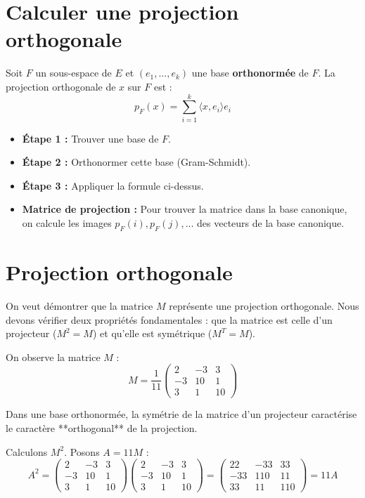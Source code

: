 \documentclass[french]{yLectureNote}
\begin{document}
\section{Calculer une projection orthogonale}
Soit $F$ un sous-espace de $E$ et $(e_1, \dots, e_k)$ une base \textbf{orthonormée} de $F$. La projection orthogonale de $x$ sur $F$ est :
\[ p_F(x) = \sum_{i=1}^k \langle x, e_i \rangle e_i \]
\begin{itemize}
    \item \textbf{Étape 1 :} Trouver une base de $F$.
    \item \textbf{Étape 2 :} Orthonormer cette base (Gram-Schmidt).
    \item \textbf{Étape 3 :} Appliquer la formule ci-dessus.
    \item \textbf{Matrice de projection :} Pour trouver la matrice dans la base canonique, on calcule les images $p_F(i), p_F(j), \dots$ des vecteurs de la base canonique.
\end{itemize}
\section{Projection orthogonale}

On veut démontrer que la matrice $M$ représente une projection orthogonale. Nous devons vérifier deux propriétés fondamentales : que la matrice est celle d'un projecteur ($M^2 = M$) et qu'elle est symétrique ($M^T = M$).

On observe la matrice $M$ :
$$M = \frac{1}{11} \begin{pmatrix} 2 & -3 & 3 \\ -3 & 10 & 1 \\ 3 & 1 & 10 \end{pmatrix}$$

Dans une base orthonormée, la symétrie de la matrice d'un projecteur caractérise le caractère **orthogonal** de la projection.

Calculons $M^2$. Posons $A = 11M$ :
$$A^2 = \begin{pmatrix} 2 & -3 & 3 \\ -3 & 10 & 1 \\ 3 & 1 & 10 \end{pmatrix} \begin{pmatrix} 2 & -3 & 3 \\ -3 & 10 & 1 \\ 3 & 1 & 10 \end{pmatrix} = \begin{pmatrix} 22 & -33 & 33 \\ -33 & 110 & 11 \\ 33 & 11 & 110 \end{pmatrix} = 11 A$$
\end{document}
